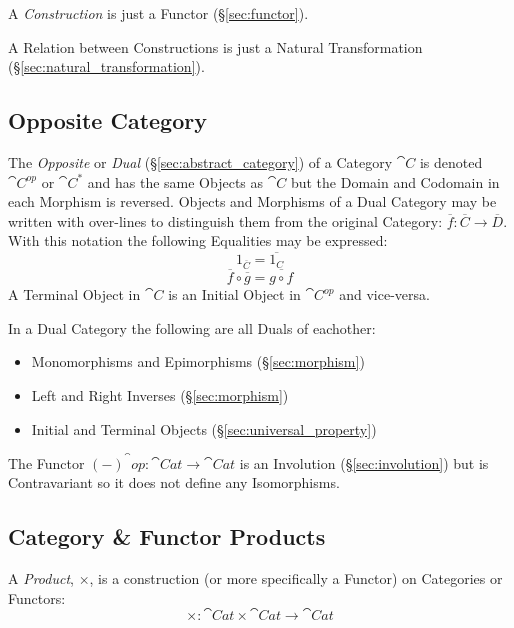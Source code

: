 A \emph{Construction} is just a Functor (\S\ref{sec:functor}).

A Relation between Constructions is just a Natural Transformation
(\S\ref{sec:natural_transformation}).



\subsection{Opposite Category}\label{sec:opposite_category}

The \emph{Opposite} or \emph{Dual} (\S\ref{sec:abstract_category})
of a Category $\cat{C}$ is denoted $\cat{C^{op}}$ or
$\cat{C^*}$ and has the same Objects as $\cat{C}$ but the Domain
and Codomain in each Morphism is reversed. Objects and Morphisms of a
Dual Category may be written with over-lines to distinguish them from
the original Category: $\overline{f}: \overline{C} \rightarrow
\overline{D}$. With this notation the following Equalities may be
expressed:
\[
  1_{\overline{C}} = \overline{1_C}
\]\[
  \overline{f} \circ \overline{g} = \overline{g \circ f}
\]
A Terminal Object in $\cat{C}$ is an Initial Object in
$\cat{C^{op}}$ and vice-versa.

In a Dual Category the following are all Duals of eachother:
\begin{itemize}
  \item Monomorphisms and Epimorphisms (\S\ref{sec:morphism})
  \item Left and Right Inverses (\S\ref{sec:morphism})
  \item Initial and Terminal Objects (\S\ref{sec:universal_property})
\end{itemize}

The Functor $(-)^\cat{op} : \cat{Cat} \rightarrow \cat{Cat}$
is an Involution (\S\ref{sec:involution}) but is Contravariant so it
does not define any Isomorphisms.



\subsection{Category \& Functor Products}\label{sec:category_product}

A \emph{Product}, $\times$, is a construction (or more specifically a
Functor) on Categories or Functors:
\[
  \times : \cat{Cat} \times \cat{Cat} \rightarrow \cat{Cat}
\]



